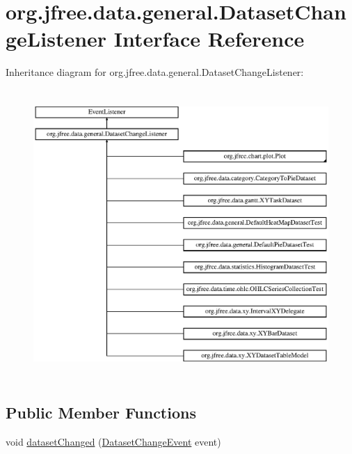 \hypertarget{interfaceorg_1_1jfree_1_1data_1_1general_1_1_dataset_change_listener}{}\section{org.\+jfree.\+data.\+general.\+Dataset\+Change\+Listener Interface Reference}
\label{interfaceorg_1_1jfree_1_1data_1_1general_1_1_dataset_change_listener}
Inheritance diagram for org.\+jfree.\+data.\+general.\+Dataset\+Change\+Listener\+:\begin{figure}[H]
\begin{center}
\leavevmode
\includegraphics[height=11.016394cm]{interfaceorg_1_1jfree_1_1data_1_1general_1_1_dataset_change_listener}
\end{center}
\end{figure}
\subsection*{Public Member Functions}
\begin{DoxyCompactItemize}
\item 
void \mbox{\hyperlink{interfaceorg_1_1jfree_1_1data_1_1general_1_1_dataset_change_listener_a26ca53969f0dfa539f52e846a3cd72fe}{dataset\+Changed}} (\mbox{\hyperlink{classorg_1_1jfree_1_1data_1_1general_1_1_dataset_change_event}{Dataset\+Change\+Event}} event)
\end{DoxyCompactItemize}


